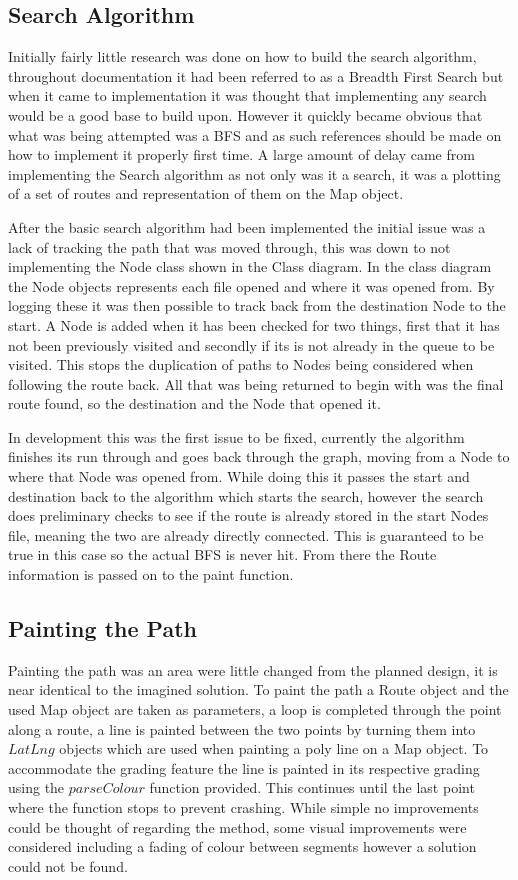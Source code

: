 \subsection{Search Algorithm}

Initially fairly little research was done on how to build the search algorithm, throughout documentation it had been referred to as a Breadth First Search but when it came to implementation it was thought that implementing any search would be a good base to build upon. However it quickly became obvious that what was being attempted was a BFS\cite{bfs} and as such references should be made on how to implement it properly first time. A large amount of delay came from implementing the Search algorithm as not only was it a search, it was a plotting of a set of routes and representation of them on the Map object. 

After the basic search algorithm had been implemented the initial issue was a lack of tracking the path that was moved through, this was down to not implementing the Node class shown in the Class diagram. In the class diagram the Node objects represents each file opened and where it was opened from. By logging these it was then possible to track back from the destination Node to the start. A Node is added when it has been checked for two things, first that it has not been previously visited and secondly if its is not already in the queue to be visited. This stops the duplication of paths to Nodes being considered when following the route back. All that was being returned to begin with was the final route found, so the destination and the Node that opened it.

In development this was the first issue to be fixed, currently the algorithm finishes its run through and goes back through the graph, moving from a Node to where that Node was opened from. While doing this it passes the start and destination back to the algorithm which starts the search, however the search does preliminary checks to see if the route is already stored in the start Nodes file, meaning the two are already directly connected. This is guaranteed to be true in this case so the actual BFS is never hit. From there the Route information is passed on to the paint function. 

\subsection{Painting the Path}
Painting the path was an area were little changed from the planned design, it is near identical to the imagined solution. To paint the path a Route object and the used Map object are taken as parameters, a loop is completed through the point along a route, a line is painted between the two points by turning them into $LatLng$ objects which are used when painting a poly line on a Map object. To accommodate the grading feature the line is painted in its respective grading using the $parseColour$ function provided. This continues until the last point where the function stops to prevent crashing. While simple no improvements could be thought of regarding the method, some visual improvements were considered including a fading of colour between segments however a solution could not be found. 

